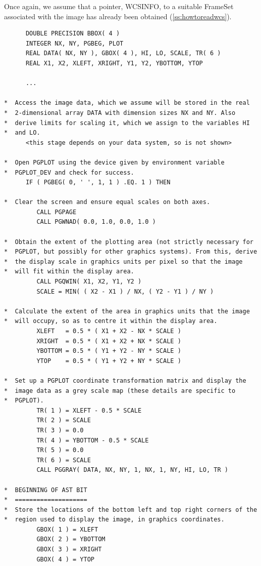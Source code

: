 \documentclass[twoside,11pt]{article}
\newcommand{\htmlref}[2]{#1}
\newcommand{\secref}[1]{\S\ref{#1}}
\renewcommand{\secref}[1]{\ref{#1}}
\begin{document}
Once again, we assume that a pointer, WCSINFO, to a suitable \htmlref{FrameSet}{FrameSet}
associated with the image has already been obtained
(\secref{ss:howtoreadwcs}).

\small
\begin{verbatim}
      DOUBLE PRECISION BBOX( 4 )
      INTEGER NX, NY, PGBEG, PLOT
      REAL DATA( NX, NY ), GBOX( 4 ), HI, LO, SCALE, TR( 6 )
      REAL X1, X2, XLEFT, XRIGHT, Y1, Y2, YBOTTOM, YTOP

      ...

*  Access the image data, which we assume will be stored in the real
*  2-dimensional array DATA with dimension sizes NX and NY. Also
*  derive limits for scaling it, which we assign to the variables HI
*  and LO.
      <this stage depends on your data system, so is not shown>

*  Open PGPLOT using the device given by environment variable
*  PGPLOT_DEV and check for success.
      IF ( PGBEG( 0, ' ', 1, 1 ) .EQ. 1 ) THEN

*  Clear the screen and ensure equal scales on both axes.
         CALL PGPAGE
         CALL PGWNAD( 0.0, 1.0, 0.0, 1.0 )

*  Obtain the extent of the plotting area (not strictly necessary for
*  PGPLOT, but possibly for other graphics systems). From this, derive
*  the display scale in graphics units per pixel so that the image
*  will fit within the display area.
         CALL PGQWIN( X1, X2, Y1, Y2 )
         SCALE = MIN( ( X2 - X1 ) / NX, ( Y2 - Y1 ) / NY )

*  Calculate the extent of the area in graphics units that the image
*  will occupy, so as to centre it within the display area.
         XLEFT   = 0.5 * ( X1 + X2 - NX * SCALE )
         XRIGHT  = 0.5 * ( X1 + X2 + NX * SCALE )
         YBOTTOM = 0.5 * ( Y1 + Y2 - NY * SCALE )
         YTOP    = 0.5 * ( Y1 + Y2 + NY * SCALE )
 
*  Set up a PGPLOT coordinate transformation matrix and display the
*  image data as a grey scale map (these details are specific to
*  PGPLOT).
         TR( 1 ) = XLEFT - 0.5 * SCALE
         TR( 2 ) = SCALE
         TR( 3 ) = 0.0
         TR( 4 ) = YBOTTOM - 0.5 * SCALE
         TR( 5 ) = 0.0
         TR( 6 ) = SCALE
         CALL PGGRAY( DATA, NX, NY, 1, NX, 1, NY, HI, LO, TR )

*  BEGINNING OF AST BIT
*  ====================
*  Store the locations of the bottom left and top right corners of the
*  region used to display the image, in graphics coordinates.
         GBOX( 1 ) = XLEFT
         GBOX( 2 ) = YBOTTOM
         GBOX( 3 ) = XRIGHT
         GBOX( 4 ) = YTOP


\end{verbatim}
\end{document}
